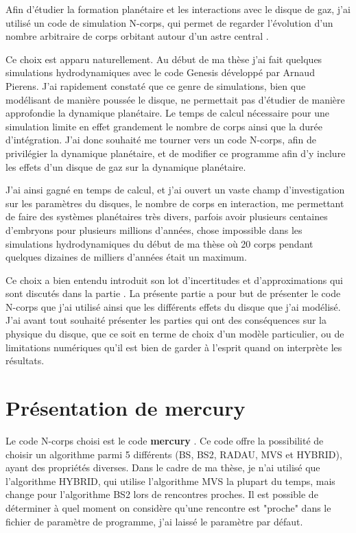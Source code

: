 Afin d'étudier la formation planétaire et les interactions avec le disque de gaz, j'ai utilisé un code de simulation N-corps, qui permet de regarder l'évolution d'un nombre arbitraire de corps orbitant autour d'un astre central \citep{chambers1999hybrid}. 

Ce choix est apparu naturellement. Au début de ma thèse j'ai fait quelques simulations hydrodynamiques avec le code Genesis développé par Arnaud Pierens. J'ai rapidement constaté que ce genre de simulations, bien que modélisant de manière poussée le disque, ne permettait pas d'étudier de manière approfondie la dynamique planétaire. Le temps de calcul nécessaire pour une simulation limite en effet grandement le nombre de corps ainsi que la durée d'intégration. J'ai donc souhaité me tourner vers un code N-corps, afin de privilégier la dynamique planétaire, et de modifier ce programme afin d'y inclure les effets d'un disque de gaz sur la dynamique planétaire. 

J'ai ainsi gagné en temps de calcul, et j'ai ouvert un vaste champ d'investigation sur les paramètres du disques, le nombre de corps en interaction, me permettant de faire des systèmes planétaires très divers, parfois avoir plusieurs centaines d'embryons pour plusieurs millions d'années, chose impossible dans les simulations hydrodynamiques du début de ma thèse où 20 corps pendant quelques dizaines de milliers d'années était un maximum. 

Ce choix a bien entendu introduit son lot d'incertitudes et d'approximations qui sont discutés dans la partie . La présente partie a pour but de présenter le code N-corps que j'ai utilisé ainsi que les différents effets du disque que j'ai modélisé. J'ai avant tout souhaité présenter les parties qui ont des conséquences sur la physique du disque, que ce soit en terme de choix d'un modèle particulier, ou de limitations numériques qu'il est bien de garder à l'esprit quand on interprète les résultats.

\section{Présentation de mercury}
Le code N-corps choisi est le code \textbf{mercury} \citep{chambers1999hybrid}. Ce code offre la possibilité de choisir un algorithme parmi 5 différents (BS, BS2, RADAU, MVS et HYBRID), ayant des propriétés diverses. Dans le cadre de ma thèse, je n'ai utilisé que l'algorithme HYBRID, qui utilise l'algorithme MVS la plupart du temps, mais change pour l'algorithme BS2 lors de rencontres proches. Il est possible de déterminer à quel moment on considère qu'une rencontre est "proche" dans le fichier de paramètre de programme, j'ai laissé le paramètre par défaut. 

